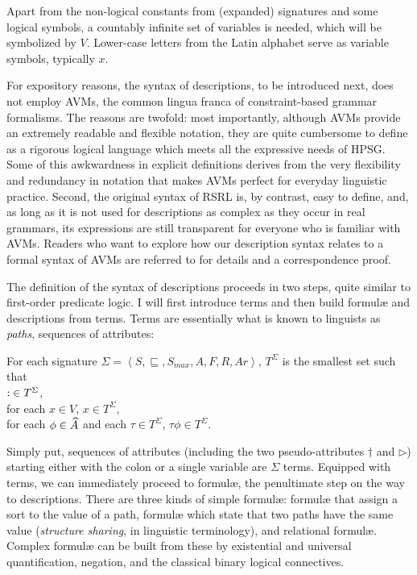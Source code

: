 \documentclass[output=paper,biblatex,babelshorthands,newtxmath,draftmode,colorlinks,citecolor=brown]{langscibook}
\begin{document}
{\begin{exe}
  \ex
\end{exe}

Apart from the non-logical constants from (expanded) signatures and
some logical symbols, a countably infinite set of
variables is needed, which will be symbolized by $V$. Lower-case letters
from the Latin alphabet serve as variable symbols, typically $x$.


For expository reasons, the syntax of descriptions, to be introduced
next, does not employ AVMs, the common
lingua franca of con\-straint-based grammar formalisms. The reasons are
twofold: most importantly, although AVMs provide an extremely readable
and flexible notation, they are quite cumbersome to define as a
rigorous logical language which meets all the expressive needs of HPSG. Some
of this awkwardness in explicit definitions derives from the very
flexibility and redundancy in notation that makes AVMs perfect for
everyday linguistic practice. Second, the original syntax of RSRL
is, by contrast, easy to define, and, as long as it is not used
for descriptions as complex as they occur in real grammars, its expressions are
still transparent for everyone who is familiar with AVMs. Readers who
want to explore how our description syntax relates to a formal syntax
of AVMs are referred to  for details and a
correspondence proof.

The definition of the syntax of descriptions proceeds in two steps,
quite similar to first-order predicate logic. I will first introduce
terms and then build formulæ and descriptions from terms. Terms are essentially
what is known to linguists as \emph{paths}, sequences of attributes:

\begin{mydef}\label{def-terms}
  For each signature $\Sigma=\left<S,\sqsubseteq,S_{max},A,F,R,Ar\right>$,
  $T^{\Sigma}$ is the smallest set such that\\
  $\operatorname{:}\in T^{\Sigma}$,\\
  for each $x\in V$, $x\in T^{\Sigma}$,\\
  for each $\phi \in \widehat{A}$ and each $\tau\in T^{\Sigma}$, $\tau\phi\in T^{\Sigma}$.
\end{mydef}

\noindent
Simply put, sequences of attributes (including the two pseudo-attributes
$\dagger$ and $\triangleright$)
starting either with the colon or a single variable are $\Sigma$ terms.
Equipped with terms, we can immediately proceed to formulæ, the penultimate
step on the way to descriptions.
There are three kinds of simple formulæ: formulæ that assign a sort
to the value of a path, formulæ which state that two paths have the
same value (\emph{structure sharing}, in linguistic terminology), and
relational formulæ. Complex formulæ can be built from these by existential
and universal quantification, negation, and the classical binary logical
connectives.

}
\end{document}
